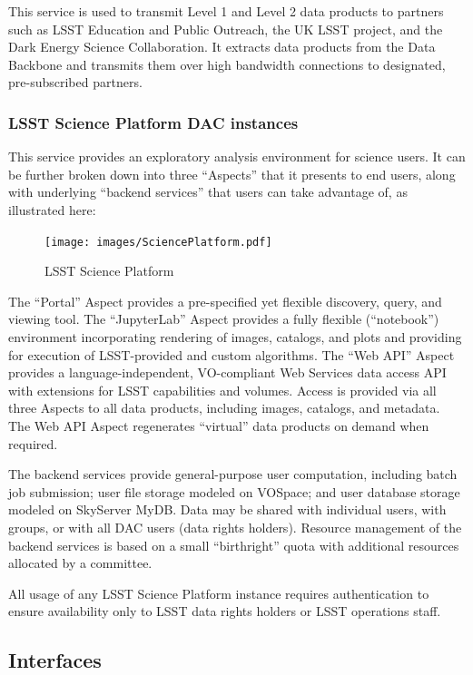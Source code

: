\documentclass[]{article}
\begin{document}
This service is used to transmit Level 1 and Level 2 data products to
partners such as LSST Education and Public Outreach, the UK LSST
project, and the Dark Energy Science Collaboration. It extracts data
products from the Data Backbone and transmits them over high bandwidth
connections to designated, pre-subscribed partners.

\subsubsection{LSST Science Platform DAC
instances}\label{lsst-science-platform-dac-instances}

This service provides an exploratory analysis environment for science
users. It can be further broken down into three ``Aspects'' that it
presents to end users, along with underlying ``backend services'' that
users can take advantage of, as illustrated here:

\begin{figure}
\centering
\texttt{[image: images/SciencePlatform.pdf]}
\caption{LSST Science Platform}
\end{figure}

The ``Portal'' Aspect provides a pre-specified yet flexible discovery,
query, and viewing tool. The ``JupyterLab'' Aspect provides a fully
flexible (``notebook'') environment incorporating rendering of images,
catalogs, and plots and providing for execution of LSST-provided and
custom algorithms. The ``Web API'' Aspect provides a
language-independent, VO-compliant Web Services data access API with
extensions for LSST capabilities and volumes. Access is provided via all
three Aspects to all data products, including images, catalogs, and
metadata. The Web API Aspect regenerates ``virtual'' data products on
demand when required.

The backend services provide general-purpose user computation, including
batch job submission; user file storage modeled on VOSpace; and user
database storage modeled on SkyServer MyDB. Data may be shared with
individual users, with groups, or with all DAC users (data rights
holders). Resource management of the backend services is based on a
small ``birthright'' quota with additional resources allocated by a
committee.

All usage of any LSST Science Platform instance requires authentication
to ensure availability only to LSST data rights holders or LSST
operations staff.

\subsection{Interfaces}\label{interfaces-3}
\end{document}
